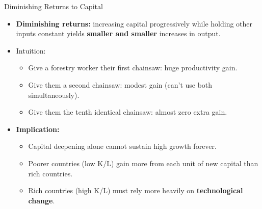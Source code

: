 \documentclass[aspectratio=169]{beamer}
\begin{document}
\begin{frame}{Diminishing Returns to Capital}
\transfade
\begin{itemize}[<+->]
  \item \textbf{Diminishing returns:} increasing capital progressively while holding other inputs constant yields \textbf{smaller and smaller} increases in output.
  \item Intuition:
  \begin{itemize}[<+->]
    \item Give a forestry worker their first chainsaw: \alert{huge} productivity gain.
    \item Give them a second chainsaw: modest gain (can't use both simultaneously).
    \item Give them the tenth identical chainsaw: almost zero extra gain.
  \end{itemize}
  \item \textbf{Implication:}
  \begin{itemize}[<+->]
    \item Capital deepening alone cannot sustain high growth forever.
    \item Poorer countries (low K/L) gain more from each unit of new capital than rich countries.
    \item Rich countries (high K/L) must rely more heavily on \textbf{technological change}.
  \end{itemize}
\end{itemize}
\end{frame}
\end{document}
